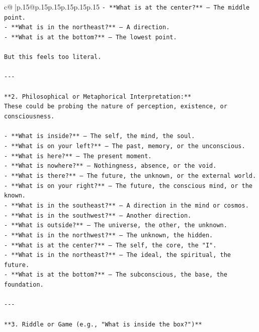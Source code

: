 \documentclass{article}
\begin{document}
{\begin{supertabular}{c@{$\;$}|p{.15\linewidth}@{}p{.15\linewidth}p{.15\linewidth}p{.15\linewidth}p{.15\linewidth}p{.15\linewidth}}
{{{\texttt{{-} **What is at the center?** — The middle point.  } \\
\texttt{{-} **What is in the northeast?** — A direction.  } \\
\texttt{{-} **What is at the bottom?** — The lowest point.} \\
\\ 
\texttt{But this feels too literal.} \\
\\ 
\texttt{{-}{-}{-}} \\
\\ 
\texttt{**2. Philosophical or Metaphorical Interpretation:**  } \\
\texttt{These could be probing the nature of perception, existence, or consciousness.} \\
\\ 
\texttt{{-} **What is inside?** — The self, the mind, the soul.  } \\
\texttt{{-} **What is on your left?** — The past, memory, or the unconscious.  } \\
\texttt{{-} **What is here?** — The present moment.  } \\
\texttt{{-} **What is nowhere?** — Nothingness, absence, or the void.  } \\
\texttt{{-} **What is there?** — The future, the unknown, or the external world.  } \\
\texttt{{-} **What is on your right?** — The future, the conscious mind, or the known.  } \\
\texttt{{-} **What is in the southeast?** — A direction in the mind or cosmos.  } \\
\texttt{{-} **What is in the southwest?** — Another direction.  } \\
\texttt{{-} **What is outside?** — The universe, the other, the unknown.  } \\
\texttt{{-} **What is in the northwest?** — The unknown, the hidden.  } \\
\texttt{{-} **What is at the center?** — The self, the core, the "I".  } \\
\texttt{{-} **What is in the northeast?** — The ideal, the spiritual, the future.  } \\
\texttt{{-} **What is at the bottom?** — The subconscious, the base, the foundation.} \\
\\ 
\texttt{{-}{-}{-}} \\
\\ 
\texttt{**3. Riddle or Game (e.g., "What is inside the box?")**  } \\
}}}
\end{supertabular}}
\end{document}
